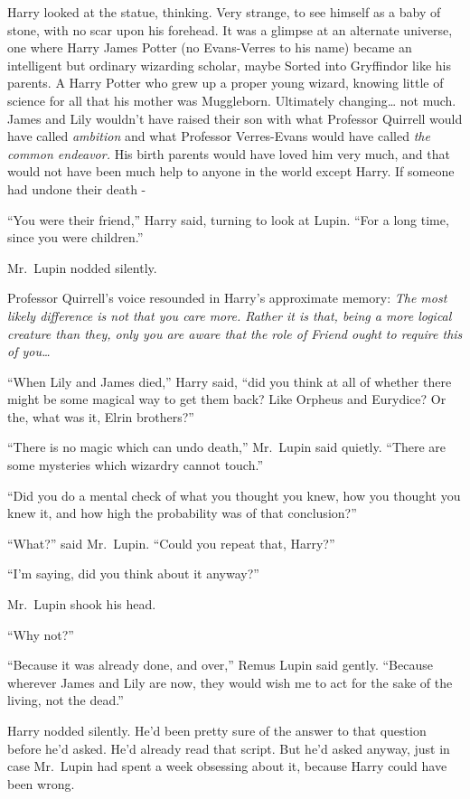 Harry looked at the statue, thinking. Very strange, to see himself as a
baby of stone, with no scar upon his forehead. It was a glimpse at an
alternate universe, one where Harry James Potter (no Evans-Verres to his
name) became an intelligent but ordinary wizarding scholar, maybe Sorted
into Gryffindor like his parents. A Harry Potter who grew up a proper
young wizard, knowing little of science for all that his mother was
Muggleborn. Ultimately changing\ldots{} not much. James and Lily
wouldn't have raised their son with what Professor Quirrell would have
called \emph{ambition} and what Professor Verres-Evans would have called
\emph{the common endeavor.} His birth parents would have loved him very
much, and that would not have been much help to anyone in the world
except Harry. If someone had undone their death -

``You were their friend,'' Harry said, turning to look at Lupin. ``For a
long time, since you were children.''

Mr.~Lupin nodded silently.

Professor Quirrell's voice resounded in Harry's approximate memory:
\emph{The most likely difference is not that you care more. Rather it is
that, being a more logical creature than they, only you are aware that
the role of Friend ought to require this of you\ldots{}}

``When Lily and James died,'' Harry said, ``did you think at all of
whether there might be some magical way to get them back? Like Orpheus
and Eurydice? Or the, what was it, Elrin brothers?''

``There is no magic which can undo death,'' Mr.~Lupin said quietly.
``There are some mysteries which wizardry cannot touch.''

``Did you do a mental check of what you thought you knew, how you
thought you knew it, and how high the probability was of that
conclusion?''

``What?'' said Mr.~Lupin. ``Could you repeat that, Harry?''

``I'm saying, did you think about it anyway?''

Mr.~Lupin shook his head.

``Why not?''

``Because it was already done, and over,'' Remus Lupin said gently.
``Because wherever James and Lily are now, they would wish me to act for
the sake of the living, not the dead.''

Harry nodded silently. He'd been pretty sure of the answer to that
question before he'd asked. He'd already read that script. But he'd
asked anyway, just in case Mr.~Lupin had spent a week obsessing about
it, because Harry could have been wrong.

